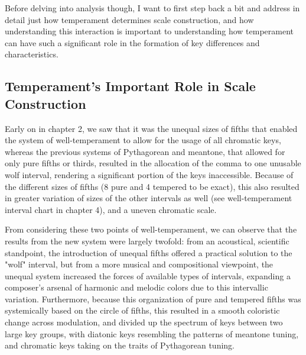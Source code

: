 Before delving into analysis though, I want to first step back a bit and
address in detail just how temperament determines scale construction,
and how understanding this interaction is important to understanding how
temperament can have such a significant role in the formation of key
differences and characteristics.

\subsection{Temperament's Important Role in Scale
Construction}\label{temperaments-important-role-in-scale-construction}

Early on in chapter 2, we saw that it was the unequal sizes of fifths
that enabled the system of well-temperament to allow for the usage of
all chromatic keys, whereas the previous systems of Pythagorean and
meantone, that allowed for only pure fifths or thirds, resulted in the
allocation of the comma to one unusable wolf interval, rendering a
significant portion of the keys inaccessible. Because of the different
sizes of fifths (8 pure and 4 tempered to be exact), this also resulted
in greater variation of sizes of the other intervals as well (see
well-temperament interval chart in chapter 4), and a uneven chromatic
scale.

From considering these two points of well-temperament, we can observe
that the results from the new system were largely twofold: from an
acoustical, scientific standpoint, the introduction of unequal fifths
offered a practical solution to the "wolf" interval, but from a more
musical and compositional viewpoint, the unequal system increased the
forces of available types of intervals, expanding a composer's arsenal
of harmonic and melodic colors due to this intervallic variation.
Furthermore, because this organization of pure and tempered fifths was
systemically based on the circle of fifths, this resulted in a smooth
coloristic change across modulation, and divided up the spectrum of keys
between two large key groups, with diatonic keys resembling the patterns
of meantone tuning, and chromatic keys taking on the traits of
Pythagorean tuning.

